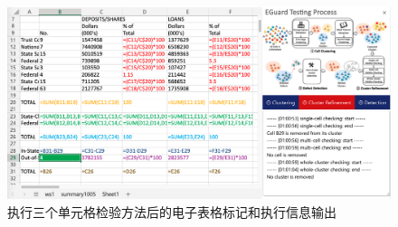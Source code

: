\begin{figure}[tbp]    
    \centering
    \includegraphics[width=\textwidth]{figure/eg/eguard-3.png}
    \caption{\eg 执行三个单元格检验方法后的电子表格标记和执行信息输出}
    \label{figure-eg3}
\end{figure}
